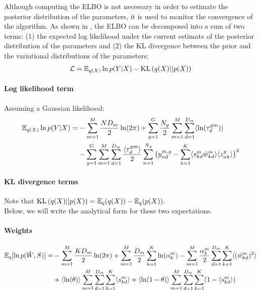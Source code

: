 Although computing the ELBO is not necessary in order to estimate the posterior distribution of the parameters, it is used to monitor the convergence of the algorithm. As shown in , the ELBO can be decomposed into a sum of two terms: (1) the expected log likelihood under the current estimate of the posterior distribution of the parameters and (2) the KL divergence between the prior and the variational distributions of the parameters:\\

\begin{equation} \begin{aligned}
    \mathcal{L} = \mathbb{E}_{q(X)} \ln p(Y|X) - {\rm KL}\left(q(X) \middle|\middle| p(X) \right)
\end{aligned} \end{equation}


\paragraph*{Log likelihood term}

Assuming a Gaussian likelihood:
\begin{equation} \begin{aligned}
	\mathbb{E}_{q(X)} \ln p(Y|X) = & -\sum_{m=1}^M \frac{ND_m}{2} \ln(2\pi) + \sum_{g=1}^G \frac{N_g}{2} \sum_{m=1}^M \sum_{d=1}^{D_m} \langle \ln(\tau_{d}^{gm}) \rangle \\
	&-\sum_{g=1}^G \sum_{m=1}^M \sum_{d=1}^{D_m} \frac{\langle \tau_{d}^{gm} \rangle}{2} \sum_{n=1}^{N_g} \big( y_{nd}^{m,g} - \sum_{k=1}^{K}\langle s_{kd}^m \hat{w}_{kd}^m \rangle \langle z_{nk}^g \rangle \big)^2
\end{aligned} \end{equation}


\paragraph*{KL divergence terms}

Note that ${\rm KL}\left(q(X) \middle|\middle| p(X) \right) = \mathbb{E}_q(q(X)) - \mathbb{E}_q(p(X))$. \\
Below, we will write the analytical form for these two expectations.

\paragraph*{Weights}

\begin{equation} \begin{aligned}
    \mathbb{E}_q[\ln p(\hat{W},S)] =& -\sum_{m=1}^{M}\frac{KD_m}{2}\ln(2\pi) + \sum_{m=1}^{M}\frac{D_m}{2}\sum_{k=1}^{K} \ln(\alpha_k^m) - \sum_{m=1}^{M} \frac{\alpha_k^m}{2} \sum_{d=1}^{D_m} \sum_{k=1}^{K} \langle (\hat{w}_{kd}^m)^2 \rangle \\
    & + \langle \ln(\theta) \rangle \sum_{m=1}^{M} \sum_{d=1}^{D_m} \sum_{k=1}^{K} \langle s_{kd}^m \rangle + \langle \ln(1-\theta) \rangle \sum_{m=1}^{M} \sum_{d=1}^{D_m}\sum_{k=1}^{K} (1- \langle s_{kd}^m \rangle)
\end{aligned} \end{equation}

